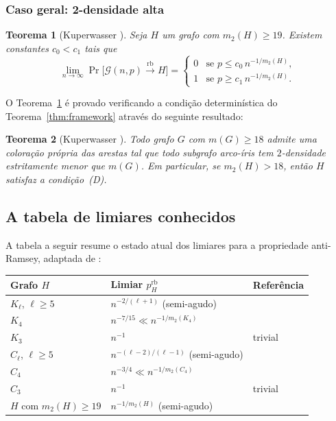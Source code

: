 \documentclass[reqno, 12pt]{amsart}
\numberwithin{equation}{section}
\theoremstyle{plain}
\newtheorem{theorem}{Teorema}[section]
\theoremstyle{definition}
\newcommand{\Gnp}{\mathcal{G}(n,p)}
\newcommand{\rb}{\xrightarrow{\,\mathrm{rb}\,}}
\newcommand{\mdens}{m_2}
\newcommand{\maxdens}{m}
\begin{document}
\subsubsection*{Caso geral: 2-densidade alta}

\begin{theorem}[Kuperwasser \cite{kuperwasser2026anti}]
\label{thm:kuperwasser}
Seja $H$ um grafo com $\mdens(H) \ge 19$.
Existem constantes $c_0 < c_1$ tais que
\[
  \lim_{n\to\infty}\Pr\!\bigl[\Gnp \rb H\bigr] =
  \begin{cases}
    0 & \text{se } p \le c_0\, n^{-1/\mdens(H)},\\
    1 & \text{se } p \ge c_1\, n^{-1/\mdens(H)}.
  \end{cases}
\]
\end{theorem}

O Teorema~\ref{thm:kuperwasser} é provado verificando a condição determinística
do Teorema~\ref{thm:framework} através do seguinte resultado:

\begin{theorem}[Kuperwasser \cite{kuperwasser2026anti}]
\label{thm:kuperwasser-det}
Todo grafo $G$ com $\maxdens(G) \ge 18$ admite uma coloração própria das arestas
tal que todo subgrafo arco-íris tem $2$-densidade estritamente menor que $\maxdens(G)$.
Em particular, se $\mdens(H) > 18$, então $H$ satisfaz a condição~\emph{(D)}.
\end{theorem}

\subsection{A tabela de limiares conhecidos}

A tabela a seguir resume o estado atual dos limiares para a propriedade anti-Ramsey,
adaptada de \cite{behague2025thresholds}:

\begin{center}
\renewcommand{\arraystretch}{1.4}
\begin{tabular}{lll}
\hline
\textbf{Grafo $H$} & \textbf{Limiar $p_H^{\mathrm{rb}}$} & \textbf{Referência}\\
\hline
$K_\ell$, $\ell \ge 5$ & $n^{-2/(\ell+1)}$ (semi-agudo) & \cite{AntiComplete}\\
$K_4$                  & $n^{-7/15} \ll n^{-1/m_2(K_4)}$& \cite{AntiComplete}\\
$K_3$                  & $n^{-1}$                        & trivial\\
$C_\ell$, $\ell \ge 5$ & $n^{-(\ell-2)/(\ell-1)}$ (semi-agudo) & \cite{AntiCycles}\\
$C_4$                  & $n^{-3/4} \ll n^{-1/m_2(C_4)}$ & \cite{AntiCycles}\\
$C_3$                  & $n^{-1}$                        & trivial\\
$H$ com $m_2(H)\ge 19$ & $n^{-1/m_2(H)}$ (semi-agudo)   & \cite{kuperwasser2026anti}\\
\hline
\end{tabular}
\end{center}
\end{document}
